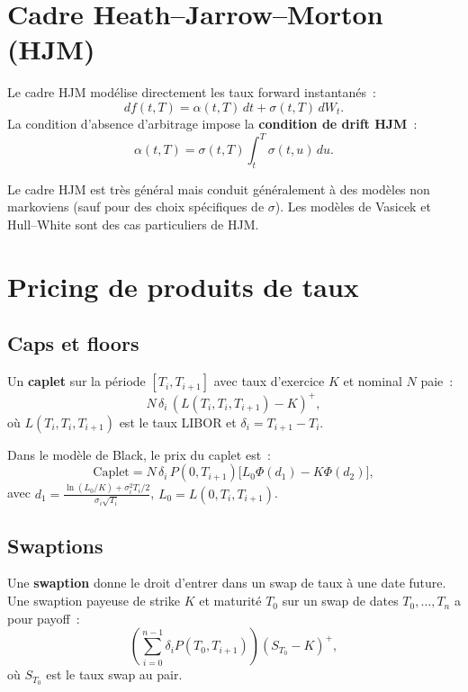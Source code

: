\section{Cadre Heath--Jarrow--Morton (HJM)}

\begin{theoreme}
Le cadre HJM mod\'elise directement les taux forward instantan\'es~:
\[
    df(t,T) = \alpha(t,T)\,dt + \sigma(t,T)\,dW_t.
\]
La condition d'absence d'arbitrage impose la \textbf{condition de drift HJM}~:
\[
    \alpha(t,T) = \sigma(t,T)\int_t^T \sigma(t,u)\,du.
\]
\end{theoreme}

\begin{remarque}
Le cadre HJM est tr\`es g\'en\'eral mais conduit g\'en\'eralement \`a des
mod\`eles non markoviens (sauf pour des choix sp\'ecifiques de $\sigma$).
Les mod\`eles de Vasicek et Hull--White sont des cas particuliers de HJM.
\end{remarque}

\section{Pricing de produits de taux}

\subsection{Caps et floors}

\begin{definition}[Caplet]
Un \textbf{caplet} sur la p\'eriode $[T_i, T_{i+1}]$ avec taux d'exercice
$K$ et nominal $N$ paie~:
\[
    N\,\delta_i\,(L(T_i, T_i, T_{i+1}) - K)^+,
\]
o\`u $L(T_i, T_i, T_{i+1})$ est le taux LIBOR et $\delta_i = T_{i+1} - T_i$.
\end{definition}

\begin{theoreme}
Dans le mod\`ele de Black, le prix du caplet est~:
\[
    \text{Caplet} = N\,\delta_i\,P(0,T_{i+1})
    \bigl[L_0\Phi(d_1) - K\Phi(d_2)\bigr],
\]
avec $d_1 = \frac{\ln(L_0/K) + \sigma_i^2 T_i/2}{\sigma_i\sqrt{T_i}}$,
$L_0 = L(0, T_i, T_{i+1})$.
\end{theoreme}

\subsection{Swaptions}

\begin{definition}[Swaption]
Une \textbf{swaption} donne le droit d'entrer dans un swap de taux \`a
une date future. Une swaption payeuse de strike $K$ et maturit\'e
$T_0$ sur un swap de dates $T_0, \ldots, T_n$ a pour payoff~:
\[
    \left(\sum_{i=0}^{n-1}\delta_i P(T_0, T_{i+1})\right)
    (S_{T_0} - K)^+,
\]
o\`u $S_{T_0}$ est le taux swap au pair.
\end{definition}

